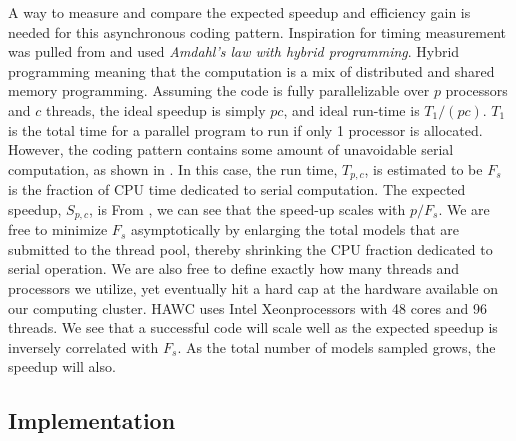 A way to measure and compare the expected speedup and efficiency gain is needed for this asynchronous coding pattern.
Inspiration for timing measurement was pulled from \cite{ArtofHPC} and used \textit{Amdahl's law with hybrid programming}.
Hybrid programming meaning that the computation is a mix of distributed and shared memory programming.
Assuming the code is fully parallelizable over $p$ processors and $c$ threads, the ideal speedup is simply $pc$, and ideal run-time is $T_1/(pc)$.
$T_1$ is the total time for a parallel program to run if only 1 processor is allocated.
However, the coding pattern contains some amount of unavoidable serial computation, as shown in .
In this case, the run time, $T_{p,c}$, is estimated to be
\amdahl
$F_s$ is the fraction of CPU time dedicated to serial computation.
The expected speedup, $S_{p,c}$, is
\amdahlSpeed
From , we can see that the speed-up scales with $p/F_s$.
We are free to minimize $F_s$ asymptotically by enlarging the total models that are submitted to the thread pool, thereby shrinking the CPU fraction dedicated to serial operation.
We are also free to define exactly how many threads and processors we utilize, yet eventually hit a hard cap at the hardware available on our computing cluster.
HAWC uses Intel Xeon\texttrademark processors with 48 cores and 96 threads.
We see that a successful code will scale well as the expected speedup is inversely correlated with $F_s$.
As the total number of models sampled grows, the speedup will also.

\subsection{Implementation}\label{sec:mtd_implementation}

